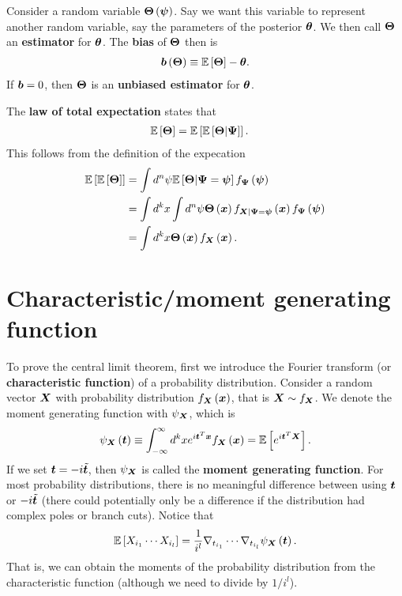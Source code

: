 Consider a random variable ${\bm \Theta}\left({\bm \psi}\right)$. 
Say we want this variable to represent another random variable, say the parameters of the posterior ${\bm \theta}$.
We then call ${\bm \Theta}$ an \textbf{estimator} for ${\bm \theta}$.
The \textbf{bias} of ${\bm \Theta}$ then is
\begin{align}
    \label{eq:bias-def}
    {\bm b}\left({\bm \Theta}\right)
    \equiv
    \mathbb{E}\left[{\bm \Theta}\right]
    -
    {\bm \theta}
    .
\end{align}
If ${\bm b}=0$, then ${\bm \Theta}$ is an \textbf{unbiased estimator} for ${\bm \theta}$.

The \textbf{law of total expectation} states that
\begin{align}
    \label{eq:law-total-expectation}
    \mathbb{E}\left[{\bm \Theta}\right]
    &=
    \mathbb{E}\left[\mathbb{E}\left[{\bm \Theta}|{\bm \Psi}\right]\right]
    .
\end{align}
This follows from the definition of the expecation
\begin{align}
    \mathbb{E}\left[\mathbb{E}\left[{\bm \Theta}\right]\right]
    &=
    \int d^n\psi\mathbb{E}\left[{\bm \Theta}|{\bm \Psi}={\bm \psi}\right] f_{{\bm \Psi}}\left({\bm \psi}\right)
    \nonumber\\
    &=
    \int d^kx\int d^n\psi {\bm \Theta}\left({\bm x}\right) f_{{\bm X}|{\bm \Psi}={\bm \psi}}\left({\bm x}\right) f_{{\bm \Psi}}\left({\bm \psi}\right)
    \nonumber\\
    &=
    \int d^kx{\bm \Theta}\left({\bm x}\right) f_{{\bm X}}\left({\bm x}\right) 
    .
\end{align}

\section{Characteristic/moment generating function}

To prove the central limit theorem, first we introduce 
the Fourier transform (or \textbf{characteristic function}) of
a probability distribution. 
Consider a random vector ${\bm X}$ with probability distribution 
$f_{{\bm X}}\left({\bm x}\right)$, that is ${\bm X}\sim f_{{\bm X}}$. 
We denote the moment generating function with $\psi_{{\bm X}}$, which is
\begin{align}
    \label{eq:moment-generating-function-def}
    \psi_{{\bm X}}\left({\bm t}\right)
    \equiv
    \int_{-\infty}^{\infty} d^kx e^{i{\bm t}^T{\bm x}} f_{{\bm X}}\left({\bm x}\right)
    = 
    \mathbb{E}\left[e^{i{\bm t}^T {\bm X}}\right] 
    .
\end{align}
If we set ${\bm t} = -i \tilde{{\bm t}}$, then $\psi_{{\bm X}}$ is called the
\textbf{moment generating function}.
For most probability distributions, there is no meaningful difference between
using ${\bm t}$ or $-i\tilde{{\bm t}}$ (there could potentially only be a difference 
if the distribution had complex poles or branch cuts).
Notice that
\begin{align}
    \mathbb{E}\left[X_{i_1}\cdots X_{i_l}\right]
    =
    \frac{1}{i^l}
    \nabla_{t_{i_1}}\cdots\nabla_{t_{i_l}}\psi_{{\bm X}}\left({\bm t}\right)
    .
\end{align}
That is, we can obtain the moments of the probability distribution from the
characteristic function (although we need to divide by $1/i^l$).

